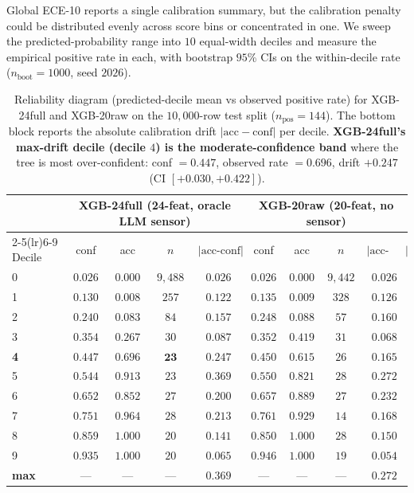 Global ECE-10 reports a single calibration summary, but the
calibration penalty could be distributed evenly across score bins
or concentrated in one. We sweep the predicted-probability range
into $10$ equal-width deciles and measure the empirical positive
rate in each, with bootstrap $95$\% CIs on the within-decile rate
($n_{\text{boot}}{=}1000$, seed $2026$).

\begin{table}[t]
\centering
\small
\caption{Reliability diagram (predicted-decile mean vs observed
positive rate) for XGB-24full and XGB-20raw on the $10{,}000$-row
test split ($n_{\text{pos}}{=}144$). The bottom block reports the
absolute calibration drift $|\text{acc} - \text{conf}|$ per decile.
\textbf{XGB-24full's max-drift decile (decile $4$) is the
moderate-confidence band} where the tree is most over-confident:
conf $= 0.447$, observed rate $= 0.696$, drift $+0.247$ (CI
$[+0.030, +0.422]$).}
\label{tab:p8-reliability}
\begin{tabular}{lcccccccc}
\toprule
 & \multicolumn{4}{c}{XGB-24full (24-feat, oracle LLM sensor)} & \multicolumn{4}{c}{XGB-20raw (20-feat, no sensor)} \\
\cmidrule(lr){2-5}\cmidrule(lr){6-9}
Decile & conf & acc & $n$ & $|\text{acc-conf}|$ & conf & acc & $n$ & $|\text{acc-conf}|$ \\
\midrule
0 & $0.026$ & $0.000$ & $9{,}488$ & $0.026$ & $0.026$ & $0.000$ & $9{,}442$ & $0.026$ \\
1 & $0.130$ & $0.008$ & $257$ & $0.122$ & $0.135$ & $0.009$ & $328$ & $0.126$ \\
2 & $0.240$ & $0.083$ & $84$ & $0.157$ & $0.248$ & $0.088$ & $57$ & $0.160$ \\
3 & $0.354$ & $0.267$ & $30$ & $0.087$ & $0.352$ & $0.419$ & $31$ & $0.068$ \\
\textbf{4} & $\mathbf{0.447}$ & $\mathbf{0.696}$ & $\mathbf{23}$ & $\mathbf{0.247}$ & $0.450$ & $0.615$ & $26$ & $0.165$ \\
5 & $0.544$ & $0.913$ & $23$ & $0.369$ & $0.550$ & $0.821$ & $28$ & $0.272$ \\
6 & $0.652$ & $0.852$ & $27$ & $0.200$ & $0.657$ & $0.889$ & $27$ & $0.232$ \\
7 & $0.751$ & $0.964$ & $28$ & $0.213$ & $0.761$ & $0.929$ & $14$ & $0.168$ \\
8 & $0.859$ & $1.000$ & $20$ & $0.141$ & $0.850$ & $1.000$ & $28$ & $0.150$ \\
9 & $0.935$ & $1.000$ & $20$ & $0.065$ & $0.946$ & $1.000$ & $19$ & $0.054$ \\
\midrule
\textbf{max} & --- & --- & --- & $\mathbf{0.369}$ & --- & --- & --- & $0.272$ \\
\bottomrule
\end{tabular}
\end{table}


